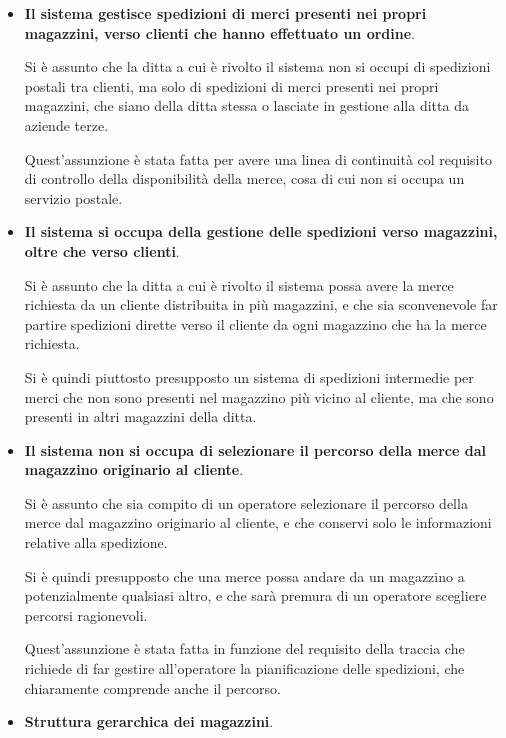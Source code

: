 \begin{itemize}
  \item \textbf{Il sistema gestisce spedizioni di merci presenti nei propri magazzini, verso clienti che hanno effettuato un ordine}.
  
  Si è assunto che la ditta a cui è rivolto il sistema non si occupi di spedizioni postali tra clienti, ma solo di spedizioni di merci presenti nei propri magazzini, che siano della ditta stessa o lasciate in gestione alla ditta da aziende terze.

  Quest'assunzione è stata fatta per avere una linea di continuità col requisito di controllo della disponibilità della merce, cosa di cui non si occupa un servizio postale.

  \item  \textbf{Il sistema si occupa della gestione delle spedizioni verso magazzini, oltre che verso clienti}.
  
  Si è assunto che la ditta a cui è rivolto il sistema possa avere la merce richiesta da un cliente distribuita in più magazzini, e che sia sconvenevole far partire spedizioni dirette verso il cliente da ogni magazzino che ha la merce richiesta.

  Si è quindi piuttosto presupposto un sistema di spedizioni intermedie per merci che non sono presenti nel magazzino più vicino al cliente, ma che sono presenti in altri magazzini della ditta.

  \item \textbf{Il sistema non si occupa di selezionare il percorso della merce dal magazzino originario al cliente}.
  
  Si è assunto che sia compito di un operatore  selezionare il percorso della merce dal magazzino originario al cliente, e che conservi solo le informazioni relative alla spedizione.

  Si è quindi presupposto che una merce possa andare da un magazzino a potenzialmente qualsiasi altro, e che sarà premura di un operatore scegliere percorsi ragionevoli.

  Quest'assunzione è stata fatta in funzione del requisito della traccia che richiede di far gestire all'operatore la pianificazione delle spedizioni, che chiaramente comprende anche il percorso.

  \item \textbf{Struttura gerarchica dei magazzini}.
  

\end{itemize}
